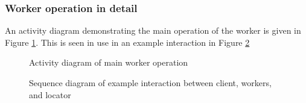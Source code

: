 \subsubsection{Worker operation in detail}

An activity diagram demonstrating the main operation of the worker is given in Figure \cref{fig:workerops}.
This is seen in use in an example interaction in Figure \cref{fig:sysinteract}

\begin{figure}

\caption{Activity diagram of main worker operation}
\label{fig:workerops}
\end{figure}

\begin{figure}

\caption{Sequence diagram of example interaction between client, workers, and locator}
\label{fig:sysinteract}
\end{figure}
